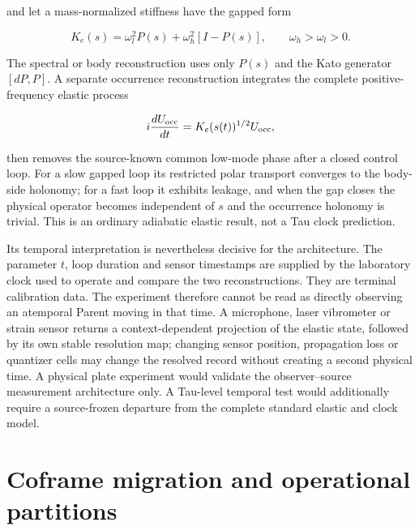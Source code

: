 \documentclass[11pt]{article}
\begin{document}
and let a mass-normalized stiffness have the gapped form

\begin{equation}
 K_e(s)=\omega_l^2P(s)+\omega_h^2[I-P(s)],
 \qquad \omega_h>\omega_l>0.
 \label{eq:elastic-clock-stiffness}
\end{equation}

The spectral or body reconstruction uses only \(P(s)\) and the Kato
generator \([dP,P]\).  A separate occurrence reconstruction integrates the
complete positive-frequency elastic process

\begin{equation}
 i\frac{dU_{\rm occ}}{dt}
 =K_e(s(t))^{1/2}U_{\rm occ},
 \label{eq:elastic-clock-occurrence}
\end{equation}

then removes the source-known common low-mode phase after a closed control
loop.  For a slow gapped loop its restricted polar transport converges to the
body-side holonomy; for a fast loop it exhibits leakage, and when the gap
closes the physical operator becomes independent of \(s\) and the occurrence
holonomy is trivial.  This is an ordinary adiabatic elastic result, not a Tau
clock prediction.

Its temporal interpretation is nevertheless decisive for the architecture.
The parameter \(t\), loop duration and sensor timestamps are supplied by the
laboratory clock used to operate and compare the two reconstructions.  They
are terminal calibration data.  The experiment therefore cannot be read as
directly observing an atemporal Parent moving in that time.  A microphone,
laser vibrometer or strain sensor returns a context-dependent projection of
the elastic state, followed by its own stable resolution map; changing sensor
position, propagation loss or quantizer cells may change the resolved record
without creating a second physical time.  A physical plate experiment would
validate the observer--source measurement architecture only.  A Tau-level
temporal test would additionally require a source-frozen departure from the
complete standard elastic and clock model.

\section{Coframe migration and operational partitions}
\end{document}
